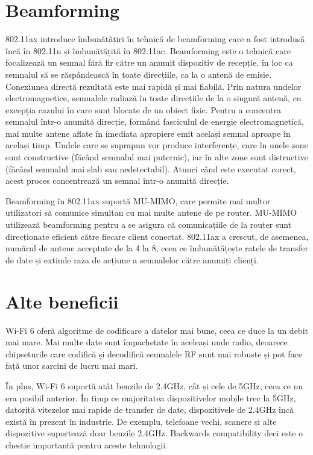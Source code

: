 \documentclass[a4paper,12pt]{report}
\begin{document}
\section{Beamforming}

802.11ax introduce îmbunătățiri în tehnică de beamforming care a fost introdusă încă în 802.11n și îmbunătățită în 802.11ac.
Beamforming este o tehnică care focalizează un semnal fără fir către un anumit dispozitiv de recepție, în loc ca semnalul să se răspândească în toate direcțiile, ca la o antenă de emisie.
Conexiunea directă rezultată este mai rapidă și mai fiabilă.
Prin natura undelor electromagnetice, semnalele radiază în toate direcțiile de la o singură antenă, cu excepția cazului în care sunt blocate de un obiect fizic. Pentru a concentra semnalul într-o anumită direcție, formând fasciculul de energie electromagnetică, mai multe antene aflate în imediata apropiere emit același semnal aproape în același timp.
Undele care se suprapun vor produce interferențe, care în unele zone sunt constructive (făcând semnalul mai puternic), iar în alte zone sunt distructive (făcând semnalul mai slab sau nedetectabil).
Atunci când este executat corect, acest proces concentrează un semnal într-o anumită direcție.

Beamforming în 802.11ax suportă MU-MIMO, care permite mai multor utilizatori să comunice simultan cu mai multe antene de pe router.
MU-MIMO utilizează beamforming pentru a se asigura că comunicațiile de la router sunt direcționate eficient către fiecare client conectat.
802.11ax a crescut, de asemenea, numărul de antene acceptate de la 4 la 8, ceea ce îmbunătățește ratele de transfer de date și extinde raza de acțiune a semnalelor către anumiți clienți.


\section{Alte beneficii}

Wi-Fi 6 oferă algoritme de codificare a datelor mai bune, ceea ce duce la un debit mai mare.
Mai multe date sunt împachetate în aceleași unde radio, deoarece chipseturile care codifică și decodifică semnalele RF sunt mai robuste și pot face față unor sarcini de lucru mai mari.

În plus, Wi-Fi 6 suportă atât benzile de 2.4GHz, cât și cele de 5GHz, ceea ce nu era posibil anterior.
În timp ce majoritatea dispozitivelor mobile trec la 5GHz, datorită vitezelor mai rapide de transfer de date, dispozitivele de 2.4GHz încă există în prezent în industrie.
De exemplu, telefoane vechi, scanere și alte dispozitive suportează doar benzile 2.4GHz.
Backwards compatibility deci este o chestie importantă pentru aceste tehnologii.
\end{document}
